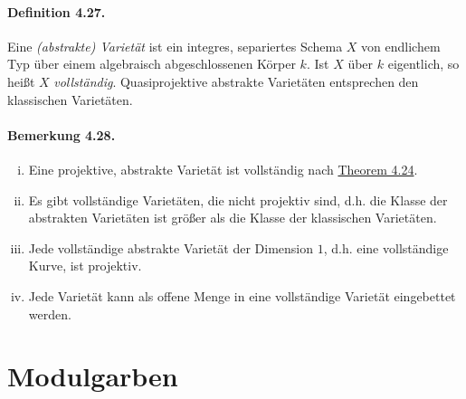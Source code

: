\paragraph{Definition 4.27.}\label{4.27} Eine \textit{(abstrakte) Varietät} ist ein integres, separiertes Schema $X$ von endlichem Typ über einem algebraisch abgeschlossenen Körper $k$. Ist $X$ über $k$ eigentlich, so heißt $X$ \textit{vollständig}. Quasiprojektive abstrakte Varietäten entsprechen den klassischen Varietäten.

\paragraph{Bemerkung 4.28.}\label{4.28}\begin{enumerate}[(i)]
\item Eine projektive, abstrakte Varietät ist vollständig nach \hyperref[4.24]{Theorem 4.24}.
\item Es gibt vollständige Varietäten, die nicht projektiv sind, d.h. die Klasse der abstrakten Varietäten ist größer als die Klasse der klassischen Varietäten.
\item Jede vollständige abstrakte Varietät der Dimension $1$, d.h. eine vollständige Kurve, ist projektiv.
\item Jede Varietät kann als offene Menge in eine vollständige Varietät eingebettet werden.
\end{enumerate}

\section{Modulgarben}

